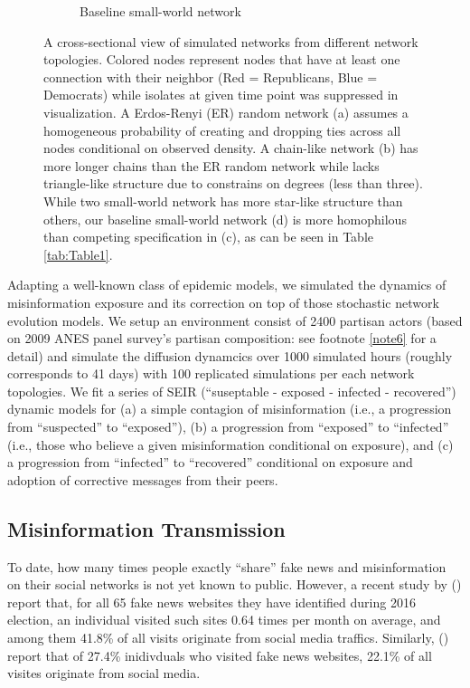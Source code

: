 \documentclass[man, 12pt, a4paper, nolmodern, noextraspace]{apa6}
\begin{document}
\begin{figure}
\begin{subfigure}[t]{0.45\textwidth}
        \caption{Baseline small-world network} \label{fig1:smallworld}
    \end{subfigure}
    
    \vspace{1cm}
    \captionsetup{format=hang}
    \caption{A cross-sectional view of simulated networks from different network topologies. Colored nodes represent nodes that have at least one connection with their neighbor (Red = Republicans, Blue = Democrats) while isolates at given time point was suppressed in visualization. A Erdos-Renyi (ER) random network (a) assumes a homogeneous probability of creating and dropping ties across all nodes conditional on observed density. A chain-like network (b) has more longer chains than the ER random network while lacks triangle-like structure due to constrains on degrees (less than three). While two small-world network has more star-like structure than others, our baseline small-world network (d) is more homophilous than competing specification in (c), as can be seen in Table \ref{tab:Table1}.} \label{fig:Figure1}
\end{figure}    

  Adapting a well-known class of epidemic models, we simulated the dynamics of misinformation exposure and its correction on top of those stochastic network evolution models. We setup an environment consist of 2400 partisan actors (based on 2009 ANES panel survey's partisan composition: see footnote \ref{note6} for a detail) and simulate the diffusion dynamcics over 1000 simulated hours (roughly corresponds to 41 days) with 100 replicated simulations per each network topologies. We fit a series of SEIR (\enquote{suseptable - exposed - infected - recovered}) dynamic models for (a) a simple contagion of misinformation (i.e., a progression from \enquote{suspected} to \enquote{exposed}), (b) a progression from \enquote{exposed} to \enquote{infected} (i.e., those who believe a given misinformation conditional on exposure), and (c) a progression from \enquote{infected} to \enquote{recovered} conditional on exposure and adoption of corrective messages from their peers. 

\subsection{Misinformation Transmission}
    
    To date, how many times people exactly \enquote{share} fake news and misinformation on their social networks is not yet known to public. However, a recent study by \citeauthor{allcott2017social} (\citeyear{allcott2017social}) report that, for all 65 fake news websites they have identified during 2016 election, an individual visited such sites 0.64 times per month on average, and among them 41.8\% of all visits originate from social media traffics. Similarly, \citeauthor{guess2018selective} (\citeyear{guess2018selective}) report that of 27.4\% inidivduals who visited fake news websites, 22.1\% of all visites originate from social media. 
\end{document}

